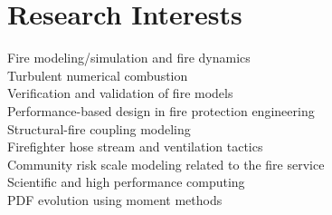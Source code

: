 \documentclass[10pt,letterpaper]{article}
\begin{document}
\section*{Research Interests}
Fire modeling/simulation and fire dynamics \\
Turbulent numerical combustion \\
Verification and validation of fire models \\
Performance-based design in fire protection engineering \\
Structural-fire coupling modeling \\
Firefighter hose stream and ventilation tactics \\
Community risk scale modeling related to the fire service \\
Scientific and high performance computing \\
PDF evolution using moment methods \\

\bigskip
\end{document}
